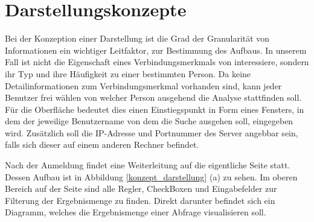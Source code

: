 \section{Darstellungskonzepte}
\label{ch:Konzeption:sec:Darstellungskonzepte}

Bei der Konzeption einer Darstellung ist die Grad der Granularität von Informationen ein wichtiger Leitfaktor, zur Bestimmung des Aufbaus. In unserem Fall ist nicht die Eigenschaft eines Verbindungsmerkmals von interessiere, sondern ihr Typ und ihre Häufigkeit zu einer bestimmten Person. Da keine Detailinformationen zum Verbindungsmerkmal vorhanden sind, kann jeder Benutzer frei wählen von welcher Person ausgehend die Analyse stattfinden soll. Für die Oberfläche bedeutet dies einen Einstiegspunkt in Form eines Fensters, in dem der jeweilige Benutzername von dem die Suche ausgehen soll, eingegeben wird. Zusätzlich soll die IP-Adresse und Portnummer des Server angebbar sein, falls sich dieser auf einem anderen Rechner befindet.

Nach der Anmeldung findet eine Weiterleitung auf die eigentliche Seite statt. Dessen Aufbau ist in Abbildung \ref{konzept_darstellung} (a) zu sehen. Im oberen Bereich auf der Seite sind alle Regler, CheckBoxen und Eingabefelder zur Filterung der Ergebnismenge zu finden. Direkt darunter befindet sich ein Diagramm, welches die Ergebnismenge einer Abfrage visualisieren soll.

